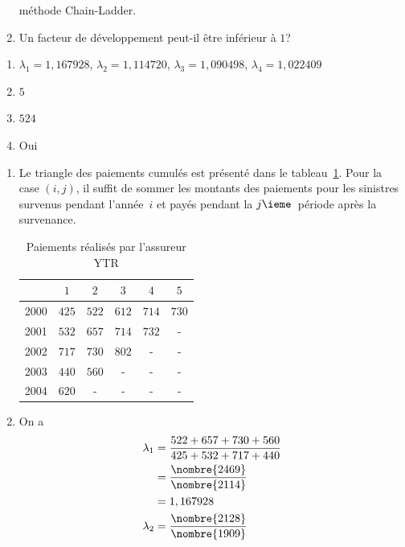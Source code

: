 \begin{exercice}
\begin{enumerate}
    méthode Chain-Ladder.
  \item Un facteur de développement peut-il être inférieur à $1$?
  \end{enumerate}
  \begin{rep}
    \begin{enumerate}
    \item $\lambda_1 = 1,167928$, $\lambda_2 = 1,114720$,
      $\lambda_3 = 1,090498$, $\lambda_4 = 1,022409$
    \item $5$
    \item $524$
    \item Oui
    \end{enumerate}
  \end{rep}
  \begin{sol}
    \begin{enumerate}
    \item Le triangle des paiements cumulés est présenté dans le
      tableau~\ref{tab:tri1}. Pour la case $(i, j)$, il suffit de
      sommer les montants des paiements pour les sinistres survenus
      pendant l'année~$i$ et payés pendant la $j\ieme$~période après
      la survenance.
      \begin{table}[!h]
        \centering
        \begin{tabular}{cccccc}
          \toprule
          & $1$ & $2$ & $3$ & $4$ & $5$\\
          \midrule
          2000 & $425$ & $522$ & $612$ & $714$ & $730$\\
          2001 & $532$ & $657$ & $714$ & $732$ & -\\
          2002 & $717$ & $730$ & $802$ & - & -\\
          2003 & $440$ & $560$ & - & - & -\\
          2004 & $620$ & - & - & - & -\\
          \bottomrule
        \end{tabular}
        \caption{Paiements réalisés par l'assureur YTR}
        \label{tab:tri1}
      \end{table}
    \item On a
      \begin{align*}
        \lambda_1 &= \frac{522 + 657 + 730 + 560}{425 + 532 + 717 + 440}\\
                  &=  \frac{\nombre{2469}}{\nombre{2114}}\\
                  &= 1,167928\\
        \lambda_2 &= \frac{\nombre{2128}}{\nombre{1909}}\\

\end{align*}
\end{enumerate}
\end{sol}
\end{exercice}
